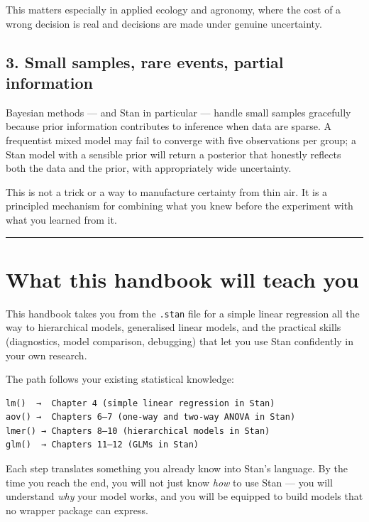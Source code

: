 \documentclass[
  11pt,
  a4paper,
  oneside,
  openany]{scrbook}
\begin{document}
This matters especially in applied ecology and agronomy, where the cost
of a wrong decision is real and decisions are made under genuine
uncertainty.

\subsection{3. Small samples, rare events, partial
information}\label{small-samples-rare-events-partial-information}

Bayesian methods --- and Stan in particular --- handle small samples
gracefully because prior information contributes to inference when data
are sparse. A frequentist mixed model may fail to converge with five
observations per group; a Stan model with a sensible prior will return a
posterior that honestly reflects both the data and the prior, with
appropriately wide uncertainty.

This is not a trick or a way to manufacture certainty from thin air. It
is a principled mechanism for combining what you knew before the
experiment with what you learned from it.

\begin{center}\rule{0.5\linewidth}{0.5pt}\end{center}

\section{What this handbook will teach
you}\label{what-this-handbook-will-teach-you}

This handbook takes you from the \texttt{.stan} file for a simple linear
regression all the way to hierarchical models, generalised linear
models, and the practical skills (diagnostics, model comparison,
debugging) that let you use Stan confidently in your own research.

The path follows your existing statistical knowledge:

\begin{verbatim}
lm()  →  Chapter 4 (simple linear regression in Stan)
aov() →  Chapters 6–7 (one-way and two-way ANOVA in Stan)
lmer() → Chapters 8–10 (hierarchical models in Stan)
glm()  → Chapters 11–12 (GLMs in Stan)
\end{verbatim}

Each step translates something you already know into Stan's language. By
the time you reach the end, you will not just know \emph{how} to use
Stan --- you will understand \emph{why} your model works, and you will
be equipped to build models that no wrapper package can express.
\end{document}
